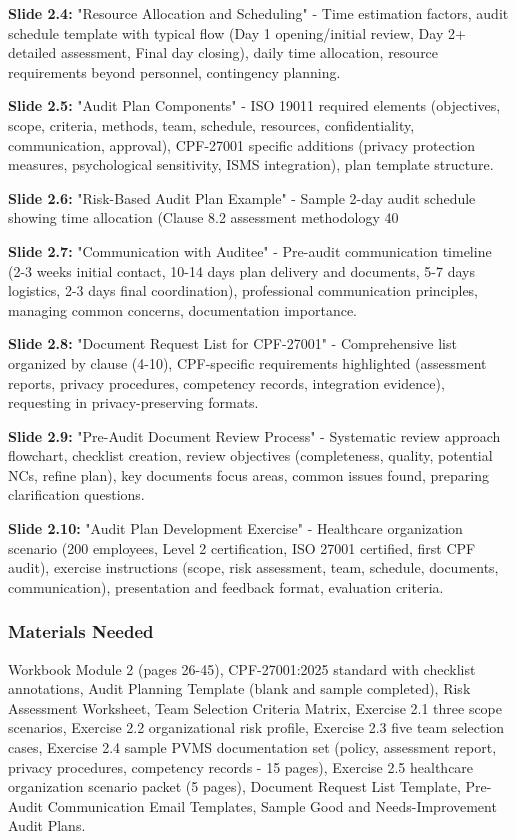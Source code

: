 \documentclass[11pt,a4paper]{article}
\begin{document}
\textbf{Slide 2.4:} "Resource Allocation and Scheduling" - Time estimation factors, audit schedule template with typical flow (Day 1 opening/initial review, Day 2+ detailed assessment, Final day closing), daily time allocation, resource requirements beyond personnel, contingency planning.

\textbf{Slide 2.5:} "Audit Plan Components" - ISO 19011 required elements (objectives, scope, criteria, methods, team, schedule, resources, confidentiality, communication, approval), CPF-27001 specific additions (privacy protection measures, psychological sensitivity, ISMS integration), plan template structure.

\textbf{Slide 2.6:} "Risk-Based Audit Plan Example" - Sample 2-day audit schedule showing time allocation (Clause 8.2 assessment methodology 40%

\textbf{Slide 2.7:} "Communication with Auditee" - Pre-audit communication timeline (2-3 weeks initial contact, 10-14 days plan delivery and documents, 5-7 days logistics, 2-3 days final coordination), professional communication principles, managing common concerns, documentation importance.

\textbf{Slide 2.8:} "Document Request List for CPF-27001" - Comprehensive list organized by clause (4-10), CPF-specific requirements highlighted (assessment reports, privacy procedures, competency records, integration evidence), requesting in privacy-preserving formats.

\textbf{Slide 2.9:} "Pre-Audit Document Review Process" - Systematic review approach flowchart, checklist creation, review objectives (completeness, quality, potential NCs, refine plan), key documents focus areas, common issues found, preparing clarification questions.

\textbf{Slide 2.10:} "Audit Plan Development Exercise" - Healthcare organization scenario (200 employees, Level 2 certification, ISO 27001 certified, first CPF audit), exercise instructions (scope, risk assessment, team, schedule, documents, communication), presentation and feedback format, evaluation criteria.

\subsubsection{Materials Needed}
Workbook Module 2 (pages 26-45), CPF-27001:2025 standard with checklist annotations, Audit Planning Template (blank and sample completed), Risk Assessment Worksheet, Team Selection Criteria Matrix, Exercise 2.1 three scope scenarios, Exercise 2.2 organizational risk profile, Exercise 2.3 five team selection cases, Exercise 2.4 sample PVMS documentation set (policy, assessment report, privacy procedures, competency records - 15 pages), Exercise 2.5 healthcare organization scenario packet (5 pages), Document Request List Template, Pre-Audit Communication Email Templates, Sample Good and Needs-Improvement Audit Plans.
\end{document}
